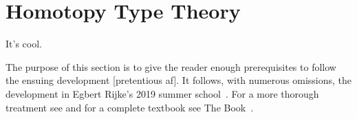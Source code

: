 \chapter{Homotopy Type Theory}
It's cool.~\cite{hottbook}

The purpose of this section is to give the reader enough prerequisites to follow the
ensuing development [pretentious af]. It follows, with numerous omissions, the
development in Egbert Rijke's 2019 summer school~\cite{Rijke2019}.
For a more thorough treatment see \autocite{Rijke2012} and for a complete
textbook see The Book~\cite{hottbook}.
